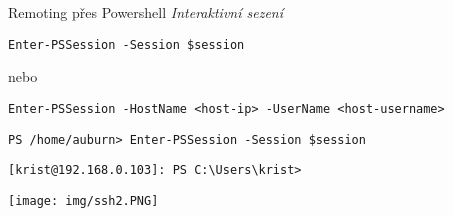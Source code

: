 \documentclass[main.tex]{subfiles}
\begin{document}
\begin{frame}{Remoting přes Powershell}
\framebreak
\textit{Interaktivní sezení}
\begin{verbatim}
Enter-PSSession -Session $session
\end{verbatim}
nebo
\begin{verbatim}
Enter-PSSession -HostName <host-ip> -UserName <host-username>
\end{verbatim}
\vspace{4mm}
\begin{verbatim}
PS /home/auburn> Enter-PSSession -Session $session
\end{verbatim}
\vspace{-13mm}
\begin{verbatim}
[krist@192.168.0.103]: PS C:\Users\krist>
\end{verbatim}
\normalsize
\framebreak
\texttt{[image: img/ssh2.PNG]}
\end{frame}
\end{document}
